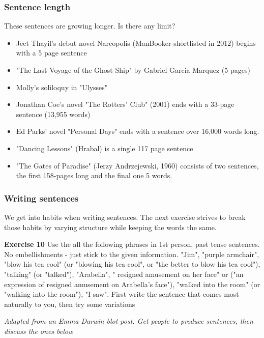 \documentclass[11pt]{article}
\newenvironment{narrow}[2]{%
 \begin{list}{}{%
  \setlength{\topsep}{0pt}%
  \setlength{\leftmargin}{#1}%
  \setlength{\rightmargin}{#2}%
  \setlength{\listparindent}{\parindent}%
  \setlength{\itemindent}{\parindent}%
  \setlength{\parsep}{\parskip}%
 }%
\item[]}{\end{list}}
\begin{document}
\subsubsection*{Sentence length}
These sentences are growing longer. Is there any limit?



\begin{itemize}
\item  Jeet Thayil’s debut novel Narcopolis (ManBooker-shortlisted in 2012) begins with a 5 page sentence
\item  "The Last Voyage of the Ghost Ship" by Gabriel Garcia Marquez (5 pages)
\item  Molly's soliloquy in "Ulysses"
\item  Jonathan Coe's novel "The Rotters' Club" (2001) ends with a 33-page sentence (13,955 words)
\item  Ed Parks' novel "Personal Days" ends with a sentence over 16,000 words long.

\item  "Dancing Lessons" (Hrabal) is a single 117 page sentence
\item   "The Gates of Paradise" (Jerzy Andrzejewski, 1960) consists of two sentences, the first 158-pages long and the final one 5 words.
\end{itemize}

\subsubsection*{Writing sentences}
We get into habits when writing sentences. The next exercise strives to break those habits by varying structure while keeping the words the same. 



\begin{narrow}{1.0cm}{1.0cm}
\textbf{Exercise 10}  Use the all the following phrases in 1st person, past tense sentences.  No embellishments - just stick to the given information. "Jim", "purple armchair", "blow his tea cool" (or "blowing his tea cool", or "the better to blow his tea cool"), "talking" (or "talked"), "Arabella", " resigned amusement on her face" or ("an expression of resigned amusement on Arabella's face"), "walked into the room" (or "walking into the room"), "I saw". First write the sentence that comes most naturally to you, then try some variations
\end{narrow}
\textit{Adapted from an Emma Darwin blot post. Get people to produce sentences, then discuss the ones below}
\end{document}
